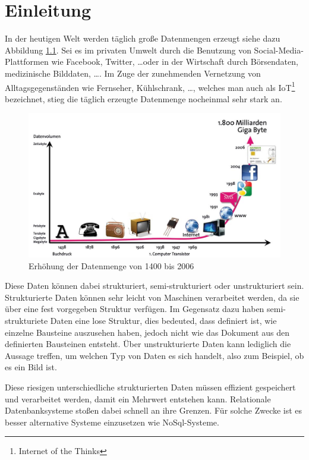 \chapter{Einleitung}

In der heutigen Welt werden täglich große Datenmengen erzeugt siehe dazu
Abbildung \ref{fig:data-grow}. Sei es im privaten Umwelt durch die Benutzung
von Social-Media-Plattformen wie Facebook, Twitter, \ldots oder in der
Wirtschaft durch Börsendaten, medizinische Bilddaten, \ldots . Im Zuge der
zunehmenden Vernetzung von Alltagsgegenständen wie Fernseher,
Kühlschrank, \ldots, welches man auch als IoT\footnote{Internet of the Thinks}
bezeichnet, stieg die täglich erzeugte Datenmenge nocheinmal sehr stark an.

\begin{figure}
\centering
\includegraphics[scale=0.5]{images/bitkom-lf-bigdata-2012-data_grow.jpg}
\caption{Erhöhung der Datenmenge von 1400 bis 2006 \cite{Weber2012}}
\label{fig:data-grow}
\end{figure}

Diese Daten können dabei strukturiert, semi-strukturiert oder unstrukturiert
sein. Strukturierte Daten können sehr leicht von Maschinen verarbeitet werden,
da sie über eine fest vorgegeben Struktur verfügen. Im Gegensatz dazu haben
semi-strukturiete Daten eine lose Struktur, dies bedeuted, dass definiert ist,
wie einzelne Bausteine auszusehen haben, jedoch nicht wie das Dokument aus den
definierten Bausteinen entsteht. Über unstrukturierte Daten kann lediglich die
Aussage treffen, um welchen Typ von Daten es sich handelt, also zum Beispiel,
ob es ein Bild ist.

Diese riesigen unterschiedliche strukturierten Daten müssen effizient
gespeichert und verarbeitet werden, damit ein Mehrwert entstehen kann.
Relationale Datenbanksysteme stoßen dabei schnell an ihre Grenzen. Für solche
Zwecke ist es besser alternative Systeme einzusetzen wie NoSql-Systeme.

